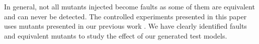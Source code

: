 In general, not all mutants injected become faults as some of them are equivalent and can never be detected. The controlled experiments presented in this paper uses mutants presented in our previous work \cite{mottu2006}. We have clearly identified faults and equivalent mutants to study the effect of our generated test models.






